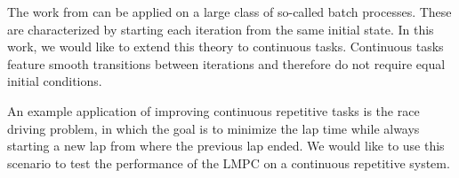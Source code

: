The work from \cite{Rosolia2016} can be applied on a large class of so-called batch processes. These are characterized by starting each iteration from the same initial state. In this work, we would like to extend this theory to continuous tasks. Continuous tasks feature smooth transitions between iterations and therefore do not require equal initial conditions.

An example application of improving continuous repetitive tasks is the race driving problem, in which the goal is to minimize the lap time while always starting a new lap from where the previous lap ended. We would like to use this scenario to test the performance of the LMPC on a continuous repetitive system.

